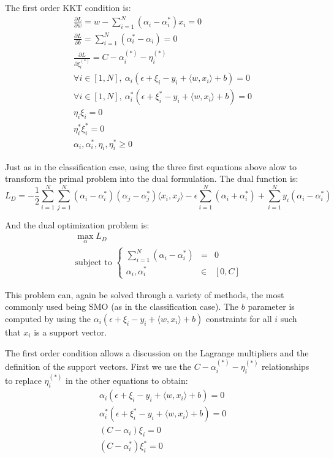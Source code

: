 \documentclass{article}
\begin{document}
The first order KKT condition is:
\begin{align*}
&\frac{\partial L}{\partial w} = w - \sum_{i=1}^N \left(\alpha_i-\alpha_i^*\right) x_i = 0\\
&\frac{\partial L}{\partial b} = \sum_{i=1}^N \left(\alpha_i^*-\alpha_i\right) = 0\\
&\frac{\partial L}{\partial \xi_i^{(*)}} = C - \alpha_i^{(*)} - \eta_i^{(*)}\\
&\forall i \in [1,N], \ \alpha_i\left(\epsilon + \xi_i - y_i + \langle w,x_i\rangle + b \right) = 0\\
&\forall i \in [1,N], \ \alpha^*_i\left(\epsilon + \xi^*_i - y_i + \langle w,x_i\rangle + b \right) = 0\\
&\eta_i \xi_i = 0\\
&\eta_i^* \xi_i^* = 0\\
&\alpha_i, \alpha_i^*, \eta_i, \eta_i^* \geq 0
\end{align*}

Just as in the classification case, using the three first equations above alow to transform the primal problem into the dual formulation. The dual function is:
\begin{equation*}
L_D = -\frac{1}{2}\sum\limits_{i=1}^N \sum\limits_{j=1}^N \left(\alpha_i - \alpha_i^*\right) \left(\alpha_j - \alpha_j^*\right) \langle x_i,x_j\rangle 
- \epsilon \sum\limits_{i=1}^N \left(\alpha_i + \alpha_i^*\right) + \sum\limits_{i=1}^N y_i \left(\alpha_i - \alpha_i^*\right)
\end{equation*}

And the dual optimization problem is:
\begin{gather*}
\max\limits_{\alpha} L_D\\
\text{subject to }\left\{\begin{array}{rcl}
\sum\limits_{i=1}^N \left(\alpha_i - \alpha^*_i\right) & = & 0\\
\alpha_i, \alpha_i^* & \in & [0,C]
\end{array}\right.
\end{gather*}

This problem can, again be solved through a variety of methods, the most commonly used being SMO (as in the classification case). The $b$ parameter is computed by using the $\alpha_i\left(\epsilon + \xi_i - y_i + \langle w,x_i\rangle + b \right)$ constraints for all $i$ such that $x_i$ is a support vector.

The first order condition allows a discussion on the Lagrange multipliers and the definition of the support vectors. First we use the $C - \alpha_i^{(*)} - \eta_i^{(*)}$ relationships to replace $\eta_i^{(*)}$ in the other equations to obtain:
\begin{align*}
&\alpha_i\left(\epsilon + \xi_i - y_i + \langle w,x_i\rangle + b \right) = 0\\
&\alpha^*_i\left(\epsilon + \xi^*_i - y_i + \langle w,x_i\rangle + b \right) = 0\\
&(C-\alpha_i) \xi_i = 0\\
&(C-\alpha_i^*) \xi_i^* = 0
\end{align*}
\end{document}
